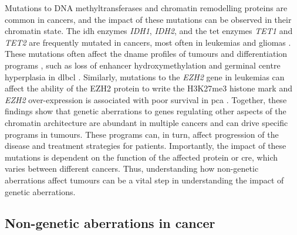 Mutations to DNA methyltransferases and chromatin remodelling proteins are common in cancers, and the impact of these mutations can be observed in their chromatin state.
The \gls{idh} enzymes \emph{IDH1}, \emph{IDH2}, and the \gls{tet}  enzymes \emph{TET1} and \emph{TET2} are frequently mutated in cancers, most often in leukemias and gliomas \cite{pirozziImplicationsIDHMutations2021,imDNMT3AIDHMutations2014,issaAcuteMyeloidLeukemia2021,molenaarWildtypeMutatedIDH12018,shihRoleMutationsEpigenetic2012}.
These mutations often affect the \gls{dname} profiles of tumours and differentiation programs \cite{pirozziImplicationsIDHMutations2021}, such as loss of enhancer hydroxymethylation and germinal centre hyperplasia in \gls{dlbcl} \cite{dominguezTET2DeficiencyCauses2018}.
Similarly, mutations to the \emph{EZH2} gene in leukemias can affect the ability of the EZH2 protein to write the H3K27me3 histone mark \cite{plassMutationsRegulatorsEpigenome2013,nikoloskiSomaticMutationsHistone2010,ernstInactivatingMutationsHistone2010,morinSomaticMutationsAltering2010} and \emph{EZH2} over-expression is associated with poor survival in \gls{pca} \cite{varamballyPolycombGroupProtein2002,xuEZH2OncogenicActivity2012,minOncogeneTumorSuppressor2010,kimTargetingEZH2Cancer2016}.
Together, these findings show that genetic aberrations to genes regulating other aspects of the chromatin architecture are abundant in multiple cancers and can drive specific programs in tumours.
These programs can, in turn, affect progression of the disease and treatment strategies for patients.
Importantly, the impact of these mutations is dependent on the function of the affected protein or \gls{cre}, which varies between different cancers.
Thus, understanding how non-genetic aberrations affect tumours can be a vital step in understanding the impact of genetic aberrations.

\subsection{Non-genetic aberrations in cancer}

